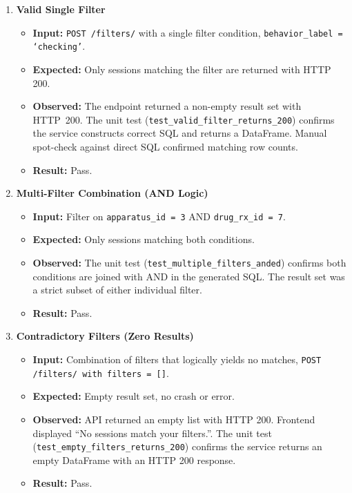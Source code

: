 \documentclass[12pt, titlepage]{article}
\begin{document}
\begin{enumerate}[label=\textbf{FR1-T\arabic*:}, leftmargin=*, labelsep=1em]
\sloppy

  \item \textbf{Valid Single Filter}
  \begin{itemize}
    \item \textbf{Input:} \texttt{POST /filters/} with a single filter condition,
      \texttt{behavior\_\allowbreak{}label = `checking'}.
    \item \textbf{Expected:} Only sessions matching the filter are returned with HTTP 200.
    \item \textbf{Observed:} The endpoint returned a non-empty result set with HTTP~200.
      The unit test (\texttt{test\_\allowbreak{}valid\_\allowbreak{}filter\_\allowbreak{}returns\_200}) confirms the service constructs correct SQL
      and returns a DataFrame. Manual spot-check against direct SQL confirmed matching row counts.
    \item \textbf{Result:} Pass.
  \end{itemize}

  \item \textbf{Multi-Filter Combination (AND Logic)}
  \begin{itemize}
    \item \textbf{Input:} Filter on \texttt{apparatus\_id = 3} AND \texttt{drug\_rx\_id = 7}.
    \item \textbf{Expected:} Only sessions matching both conditions.
    \item \textbf{Observed:} The unit test (\texttt{test\_\allowbreak{}multiple\_\allowbreak{}filters\_\allowbreak{}anded}) confirms both
      conditions are joined with AND in the generated SQL. The result set was a strict subset of either individual filter.
    \item \textbf{Result:} Pass.
  \end{itemize}

  \item \textbf{Contradictory Filters (Zero Results)}
  \begin{itemize}
    \item \textbf{Input:} Combination of filters that logically yields no matches, \texttt{POST /filters/ with filters = []}.
    \item \textbf{Expected:} Empty result set, no crash or error.
    \item \textbf{Observed:} API returned an empty list with HTTP 200. Frontend displayed ``No sessions match your filters.''.
      The unit test (\texttt{test\_\allowbreak{}empty\_\allowbreak{}filters\_\allowbreak{}returns\_200}) confirms the service 
      returns an empty DataFrame with an HTTP 200 response.
    \item \textbf{Result:} Pass.
  \end{itemize}


\end{enumerate}
\end{document}

